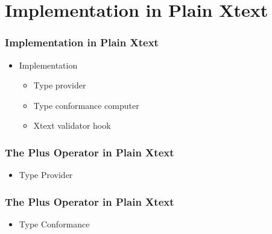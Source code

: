 \def \tyPlain {Implementation in Plain Xtext}
\def \tyPlusPlain {The Plus Operator in Plain Xtext}
\section[Plain Xtext]{\tyPlain}

\begin{frame}
  \tableofcontents[currentsection]
\end{frame}

\begin{frame}[fragile]
  \frametitle{\tyPlain}
  \begin{itemize}
    \item Implementation 
    \begin{itemize}
      \item Type provider 
      \item Type conformance computer
      \item Xtext validator hook
    \end{itemize}
  \end{itemize}
\end{frame}


\begin{frame}[fragile]
  \frametitle{\tyPlusPlain}
  \begin{itemize}
    \item Type Provider 
  \end{itemize}

  \begin{footnotesize}
    
  \end{footnotesize}
\end{frame}

\begin{frame}[fragile]
  \frametitle{\tyPlusPlain}
  \begin{itemize}
    \item Type Conformance 
  \end{itemize}

  \begin{footnotesize}
    
  \end{footnotesize}
\end{frame}